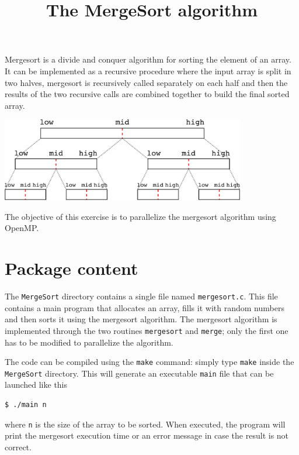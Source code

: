 \documentclass{article}
\title{The MergeSort algorithm}
\date{}
\begin{document}
\maketitle
Mergesort is a divide and conquer algorithm for sorting the element of
an array. It can be implemented as a recursive procedure where the
input array is split in two halves, mergesort is recursively called
separately on each half and then the results of the two recursive calls
are combined together to build the final sorted array. 

\vspace{0.5cm}

\begin{minipage}{1.0\linewidth}
  \centering
  \includegraphics[width=0.8\textwidth]{msort}
\end{minipage}

The objective of this exercise is to parallelize the mergesort
algorithm using OpenMP.

\section{Package content}
The \texttt{MergeSort} directory contains a single file named
\texttt{mergesort.c}. This file contains a main program that allocates
an array, fills it with random numbers and then sorts it using the
mergesort algorithm. The mergesort algorithm is implemented through
the two routines \texttt{mergesort} and \texttt{merge}; only the first
one has to be modified to parallelize the algorithm.

The code can be compiled using the \texttt{make} command: simply type
\texttt{make} inside the \texttt{MergeSort} directory. This will
generate an executable \texttt{main} file that can be launched like
this
\begin{verbatim}
$ ./main n
\end{verbatim}
where \texttt{n} is the size of the array to be sorted. When executed,
the program will print the mergesort execution time or an error
message in case the result is not correct.
\end{document}
